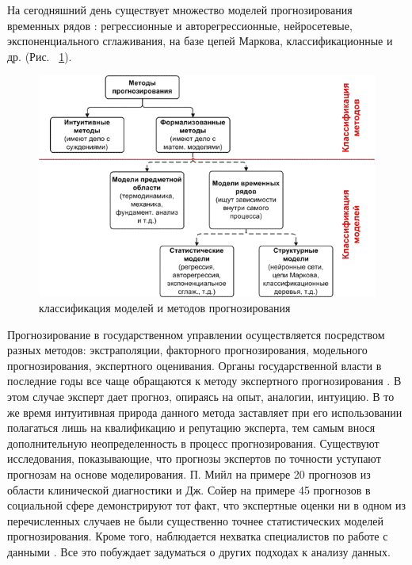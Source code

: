На сегодняшний день существует множество моделей прогнозирования временных рядов \cite{Chuchueva2012}: регрессионные и авторегрессионные, 
нейросетевые, экспоненциального сглаживания, на базе цепей Маркова, классификационные и др. (Рис. ~\ref{figure:mod_classifier}).
\begin{figure}[bhtp]
    \includegraphics{images/mod_classifier.png}
    \caption{классификация моделей и методов прогнозирования \cite{Chuchueva13habr}}
    \label{figure:mod_classifier}
\end{figure}
Прогнозирование в государственном управлении осуществляется посредством разных методов: экстраполяции, факторного прогнозирования, 
модельного прогнозирования, экспертного оценивания. 
Органы государственной власти в последние годы все чаще обращаются к методу экспертного прогнозирования \cite{Gegedush2008}. 
В этом случае эксперт дает прогноз, опираясь на опыт, аналогии, интуицию. 
В то же время интуитивная природа данного метода заставляет при его использовании полагаться лишь на квалификацию и репутацию эксперта, 
тем самым внося дополнительную неопределенность в процесс прогнозирования. 
Существуют исследования, показывающие, что прогнозы экспертов по точности уступают прогнозам на основе моделирования. 
П. Мийл на примере 20 прогнозов из области клинической диагностики \cite{MeehlClinStat} 
и Дж. Сойер на примере 45 прогнозов в социальной сфере \cite{Sawyer1966} демонстрируют тот факт, 
что экспертные оценки ни в одном из перечисленных случаев не были существенно точнее статистических моделей прогнозирования. 
Кроме того, наблюдается нехватка специалистов по работе с данными \cite{Davenport2012}. 
Все это побуждает задуматься о других подходах к анализу данных. 

